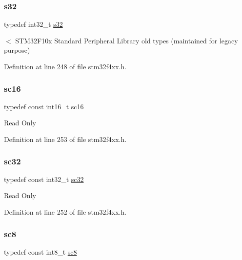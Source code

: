 \subsubsection{\texorpdfstring{s32}{s32}}
{\footnotesize\ttfamily typedef int32\+\_\+t \hyperlink{group___exported__types_gae9b1af5c037e57a98884758875d3a7c4}{s32}}

$<$ S\+T\+M32\+F10x Standard Peripheral Library old types (maintained for legacy purpose) 

Definition at line 248 of file stm32f4xx.\+h.

\mbox{\label{group___exported__types_ga66ab742a0751bb4e7661b8e874f2ddda}} 
\subsubsection{\texorpdfstring{sc16}{sc16}}
{\footnotesize\ttfamily typedef const int16\+\_\+t \hyperlink{group___exported__types_ga66ab742a0751bb4e7661b8e874f2ddda}{sc16}}

Read Only 

Definition at line 253 of file stm32f4xx.\+h.

\mbox{\label{group___exported__types_gad97679599f3791409523fdb1c6156a28}} 
\subsubsection{\texorpdfstring{sc32}{sc32}}
{\footnotesize\ttfamily typedef const int32\+\_\+t \hyperlink{group___exported__types_gad97679599f3791409523fdb1c6156a28}{sc32}}

Read Only 

Definition at line 252 of file stm32f4xx.\+h.

\mbox{\label{group___exported__types_ga30e6c0f6718e1b6d26dc9d94ddcf9d11}} 
\subsubsection{\texorpdfstring{sc8}{sc8}}
{\footnotesize\ttfamily typedef const int8\+\_\+t \hyperlink{group___exported__types_ga30e6c0f6718e1b6d26dc9d94ddcf9d11}{sc8}}


